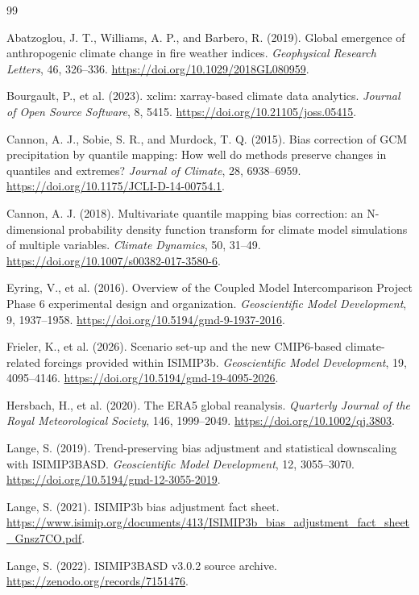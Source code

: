 \documentclass[11pt]{article}
\begin{document}
\begin{thebibliography}{99}

Abatzoglou, J. T., Williams, A. P., and Barbero, R. (2019).
Global emergence of anthropogenic climate change in fire weather indices.
\emph{Geophysical Research Letters}, 46, 326--336.
\url{https://doi.org/10.1029/2018GL080959}.

Bourgault, P., et al. (2023).
xclim: xarray-based climate data analytics.
\emph{Journal of Open Source Software}, 8, 5415.
\url{https://doi.org/10.21105/joss.05415}.

Cannon, A. J., Sobie, S. R., and Murdock, T. Q. (2015).
Bias correction of GCM precipitation by quantile mapping: How well do methods
preserve changes in quantiles and extremes? \emph{Journal of Climate}, 28,
6938--6959.
\url{https://doi.org/10.1175/JCLI-D-14-00754.1}.

Cannon, A. J. (2018).
Multivariate quantile mapping bias correction: an N-dimensional probability
density function transform for climate model simulations of multiple
variables. \emph{Climate Dynamics}, 50, 31--49.
\url{https://doi.org/10.1007/s00382-017-3580-6}.

Eyring, V., et al. (2016).
Overview of the Coupled Model Intercomparison Project Phase 6 experimental
design and organization. \emph{Geoscientific Model Development}, 9,
1937--1958. \url{https://doi.org/10.5194/gmd-9-1937-2016}.

Frieler, K., et al. (2026).
Scenario set-up and the new CMIP6-based climate-related forcings provided
within ISIMIP3b. \emph{Geoscientific Model Development}, 19, 4095--4146.
\url{https://doi.org/10.5194/gmd-19-4095-2026}.

Hersbach, H., et al. (2020).
The ERA5 global reanalysis. \emph{Quarterly Journal of the Royal Meteorological
Society}, 146, 1999--2049. \url{https://doi.org/10.1002/qj.3803}.

Lange, S. (2019).
Trend-preserving bias adjustment and statistical downscaling with
ISIMIP3BASD. \emph{Geoscientific Model Development}, 12, 3055--3070.
\url{https://doi.org/10.5194/gmd-12-3055-2019}.

Lange, S. (2021).
ISIMIP3b bias adjustment fact sheet.
\url{https://www.isimip.org/documents/413/ISIMIP3b_bias_adjustment_fact_sheet_Gnsz7CO.pdf}.

Lange, S. (2022).
ISIMIP3BASD v3.0.2 source archive.
\url{https://zenodo.org/records/7151476}.


\end{thebibliography}
\end{document}
